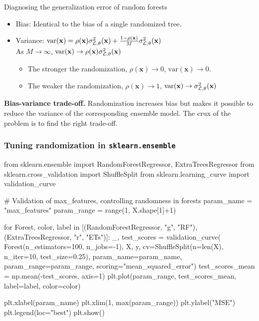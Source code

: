 \documentclass{beamer}
\begin{document}
\begin{frame}{Diagnosing the generalization error of random forests}

\begin{itemize}
\item Bias: {\color{blue} Identical} to the bias of a single randomized tree.
\item Variance: $\text{var}(\mathbf{x}) = \rho(\mathbf{x}) \sigma^2_{{\cal L},\theta}(\mathbf{x}) + \frac{1 - \rho(\mathbf{x})}{M} \sigma^2_{{\cal L},\theta}(\mathbf{x})$\\
As $M \to \infty$, {\color{red} $\text{var}(\mathbf{x}) \to \rho(\mathbf{x}) \sigma^2_{{\cal L},\theta}(\mathbf{x})$}
  \begin{itemize}
    \item The stronger the randomization, $\rho(\mathbf{x}) \to 0$, $\text{var}(\mathbf{x}) \to 0$.
    \item The weaker the randomization, $\rho(\mathbf{x}) \to 1$, $\text{var}(\mathbf{x}) \to \sigma^2_{{\cal L},\theta}(\mathbf{x})$
  \end{itemize}
\end{itemize}

\vspace{1cm}

{\bf Bias-variance trade-off.} Randomization increases bias but makes it
possible to reduce the variance of the corresponding ensemble model. The crux
of the problem is to {\color{red} find the right trade-off}.

\end{frame}


\begin{frame}[fragile]
\frametitle{Tuning randomization in \texttt{sklearn.ensemble}}

{\scriptsize
\begin{pythoncode}
from sklearn.ensemble import RandomForestRegressor, ExtraTreesRegressor
from sklearn.cross_validation import ShuffleSplit
from sklearn.learning_curve import validation_curve

# Validation of max_features, controlling randomness in forests
param_name = "max_features"
param_range = range(1, X.shape[1]+1)

for Forest, color, label in [(RandomForestRegressor, "g", "RF"),
                             (ExtraTreesRegressor, "r", "ETs")]:
    _, test_scores = validation_curve(
        Forest(n_estimators=100, n_jobs=-1), X, y,
        cv=ShuffleSplit(n=len(X), n_iter=10, test_size=0.25),
        param_name=param_name, param_range=param_range,
        scoring="mean_squared_error")
    test_scores_mean = np.mean(-test_scores, axis=1)
    plt.plot(param_range, test_scores_mean, label=label, color=color)

plt.xlabel(param_name)
plt.xlim(1, max(param_range))
plt.ylabel("MSE")
plt.legend(loc="best")
plt.show()
\end{pythoncode}
}
\end{frame}
\end{document}
